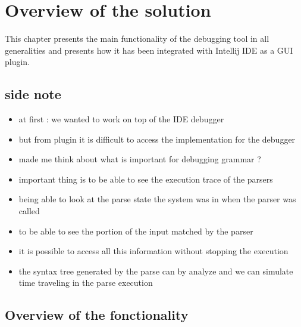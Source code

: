 %
\chapter{Overview of the solution}
%
This chapter presents the main functionality of the debugging tool in all generalities and presents how it has been integrated with Intellij IDE as a GUI plugin.

\section{side note}

	\begin{itemize}
		\item at first : we wanted to work on top of the IDE debugger
		\item but from plugin it is difficult to access the implementation for the debugger
		\item made me think about what is important for debugging grammar ?
		\item important thing is to be able to see the execution trace of the parsers
		\item being able to look at the parse state the system was in when the parser was called
		\item to be able to see the portion of the input matched by the parser
		\item it is possible to access all this information without stopping the execution
		\item the syntax tree generated by the parse can by analyze and we can simulate time traveling in the parse execution
	\end{itemize}
	\section{Overview of the fonctionality}

